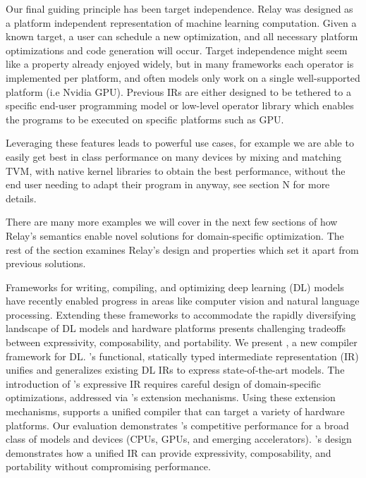 Our final guiding principle has been target independence. Relay was designed as a platform independent representation of machine learning computation. Given a known target, a user can schedule a new optimization, and all necessary platform optimizations and code generation will occur. Target independence might seem like a property already enjoyed widely, but in many frameworks each operator is implemented per platform, and often models only work on a single well-supported platform (i.e Nvidia GPU).  Previous IRs are either designed to be tethered to a specific end-user programming model or low-level operator library which enables the programs to be executed on specific platforms such as GPU.

Leveraging these features leads to powerful use cases, for example we are able to easily get best in class performance on many devices by mixing and matching TVM, with native kernel libraries to obtain the best performance, without the end user needing to adapt their program in anyway, see section N for more details.

There are many more examples we will cover in the next few sections of how Relay’s semantics enable novel solutions for domain-specific optimization. The rest of the section examines Relay’s design and properties which set it apart from previous solutions.



Frameworks for writing, compiling, and optimizing
  deep learning (DL) models have recently
  enabled progress in areas like computer
  vision and natural language processing.
Extending these frameworks to accommodate
  the rapidly diversifying landscape of
  DL models and hardware platforms presents
  challenging tradeoffs between
  expressivity, composability, and portability.
We present \relay,
  a new compiler framework for DL.
\relay's functional, statically typed intermediate representation (IR)
  unifies and generalizes existing DL IRs
  to express state-of-the-art models.
The introduction of \relay's expressive IR requires
  careful design of domain-specific optimizations,
  addressed via \relay's extension mechanisms.
Using these extension mechanisms,
  \relay supports a unified compiler that
  can target a variety of hardware platforms.
Our evaluation demonstrates \relay's competitive performance for a
  broad class of models and devices
  (CPUs, GPUs, and emerging accelerators).
\relay's design demonstrates how a unified IR can provide
  expressivity, composability, and portability
  without compromising performance.


